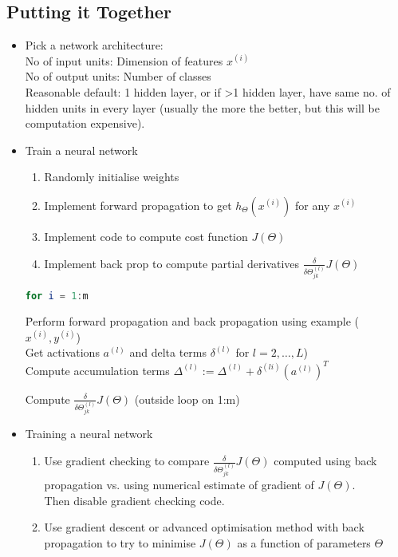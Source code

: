 \documentclass{scrartcl}
\begin{document}
\subsection{Putting it Together}
\label{sec:9-7}
\begin{itemize}
\item Pick a network architecture:\\
  No of input units: Dimension of features $x^{(i)}$ \\
  No of output units: Number of classes \\
  Reasonable default: 1 hidden layer, or if >1 hidden layer, have same
  no. of hidden units in every layer (usually the more the better, but
  this will be computation expensive).
\item Train a neural network
  \begin{enumerate}
  \item Randomly initialise weights
  \item Implement forward propagation to get $h_\Theta(x^{(i)})$ for
    any $x^{(i)}$
  \item Implement code to compute cost function $J(\Theta)$
  \item Implement back prop to compute partial derivatives
    $\frac{\delta}{\delta\Theta_{jk}^{(l)}} J(\Theta)$
  \end{enumerate}
\begin{lstlisting}[language=Octave]
    for i = 1:m
\end{lstlisting}
  \begin{tabbing}
    \quad \quad \quad \quad \= Perform forward propagation and back propagation using
    example ($x^{(i)}, y^{(i)}$)  \\
    \>Get activations $a^{(l)}$ and delta terms $\delta^{(l)}$ for $l=2,
    \dots, L$)\\
    \>Compute accumulation terms $\Delta^{(l)} := \Delta^{(l)} +
    \delta^{(li)}(a^{(l)})^T$
  \end{tabbing} 
  Compute $\frac{\delta}{\delta \Theta_{jk}^{(l)}} J(\Theta)$ (outside
  loop on 1:m)
\item Training a neural network
  \begin{enumerate}
  \item Use gradient checking to compare $\frac{\delta}{\delta
      \Theta_{jk}^{(l)}} J(\Theta)$ computed using back propagation
    vs. using numerical estimate of gradient of $J(\Theta)$. \\
    Then disable gradient checking code.
  \item Use gradient descent or advanced optimisation method with back
    propagation to try to minimise $J(\Theta)$ as a function of
    parameters $\Theta$
  \end{enumerate}
\end{itemize}
\end{document}
